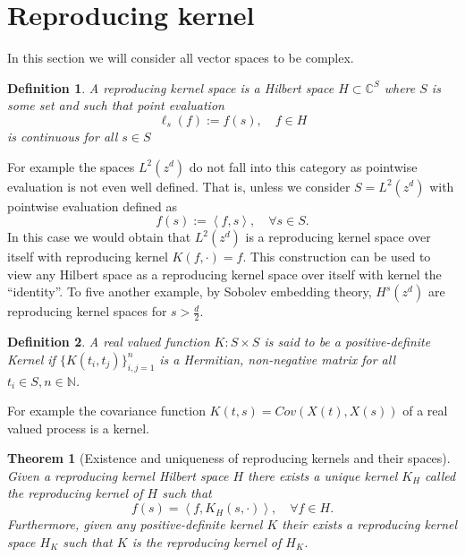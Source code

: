 \documentclass[12pt]{article}
\newcommand{\br}[1]{\left\langle#1\right\rangle}
\newcommand{\C}{\mathbb{C}}
\newcommand{\N}{\mathbb{N}}
\newcommand{\R}zzzzz
\newtheorem{theorem}{Theorem}
\newtheorem{definition}{Definition}
\begin{document}
\section{Reproducing kernel}
In this section we will consider all vector spaces to be complex.
\begin{definition}
	A reproducing kernel space is a Hilbert space $H\subset \C^S$ where $S$ is some set and such that  point evaluation $$\ell _s(f):=f(s),\quad f\in H$$ is continuous for all $s\in S$
\end{definition}
For example the spaces $L^2(\R^d)$ do not fall into this category as pointwise evaluation is not even well defined. That is, unless we consider $S=L^2(\R^d)$ with pointwise evaluation defined as
\begin{equation*}
	f(s):=\br{f,s},\quad\forall s\in S.
\end{equation*}
In this case we would obtain that $L^2(\R^d)$ is a reproducing kernel space over itself with reproducing kernel $K(f,\cdot )=f.$ This construction can be used to view any Hilbert space as a reproducing kernel space over itself with kernel the ``identity''. To five another example, by Sobolev embedding theory, $H^s(\R^d)$ are reproducing kernel spaces for $s>\frac{d}{2}$.
\begin{definition}
	A real valued function $K:S\times S$ is said to be a positive-definite  Kernel if  $\{K(t_i,t_j)\}_{i,j=1}^n$ is a Hermitian, non-negative matrix for all $t_i \in S,n \in \N$.
\end{definition}
For example the covariance function $K(t,s)=Cov(X(t),X(s))$ of a real valued process is a kernel.
\begin{theorem}[Existence and uniqueness of reproducing kernels and their spaces]
	Given a reproducing kernel Hilbert space $H$ there exists a unique kernel $K_H$ called the \emph{reproducing kernel} of $H$ such that
	\begin{equation*}
		f(s)=\br{f,K_H(s,\cdot )},\quad\forall f\in H.
	\end{equation*}
	Furthermore, given any positive-definite kernel $K$ their exists a reproducing kernel space $H_K$ such that $K$ is the reproducing kernel of $H_K$.
\end{theorem}
\end{document}

